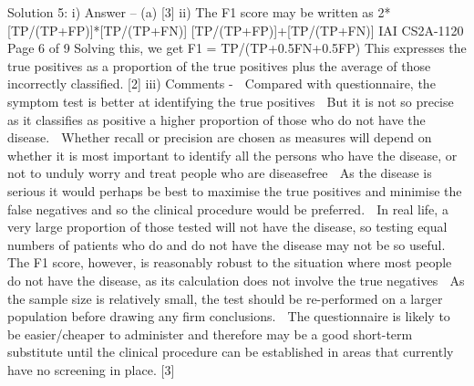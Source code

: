 \documentclass[a4paper,12pt]{article}
\begin{document}
Solution 5:
i) Answer – (a) [3]
ii)
The F1 score may be written as
2*[TP/(TP+FP)]*[TP/(TP+FN)]
[TP/(TP+FP)]+[TP/(TP+FN)]
IAI CS2A-1120
Page 6 of 9
Solving this, we get F1 = TP/(TP+0.5FN+0.5FP)
This expresses the true positives as a proportion of the true positives plus the average of those
incorrectly classified.
[2]
iii)
Comments -
 Compared with questionnaire, the symptom test is better at identifying the true positives
 But it is not so precise as it classifies as positive a higher proportion of those who do not have the
disease.
 Whether recall or precision are chosen as measures will depend on whether it is most important to
identify all the persons who have the disease, or not to unduly worry and treat people who are diseasefree
 As the disease is serious it would perhaps be best to maximise the true positives and minimise the
false negatives and so the clinical procedure would be preferred.
 In real life, a very large proportion of those tested will not have the disease, so testing equal numbers
of patients who do and do not have the disease may not be so useful.
 The F1 score, however, is reasonably robust to the situation where most people do not have the
disease, as its calculation does not involve the true negatives
 As the sample size is relatively small, the test should be re-performed on a larger population before
drawing any firm conclusions.
 The questionnaire is likely to be easier/cheaper to administer and therefore may be a good short-term
substitute until the clinical procedure can be established in areas that currently have no screening in
place.
[3]
\end{document}

